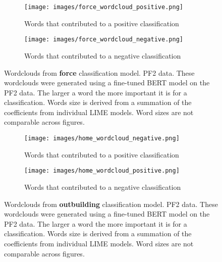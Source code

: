 \begin{figure}
     \centering
     \begin{subfigure}[b]{0.9\textwidth}
         \centering
         \texttt{[image: images/force\_wordcloud\_positive.png]}
         \caption{Words that contributed to a positive classification}
         \label{fig: wordcloud_force_lancs}
     \end{subfigure}
     \vfill
     \begin{subfigure}[b]{0.9\textwidth}
         \centering
         \texttt{[image: images/force\_wordcloud\_negative.png]}
         \caption{Words that contributed to a negative classification}
         \label{fig: wordcloud_force_rev_lancs}
     \end{subfigure}
        \caption[Wordclouds from  \textbf{force} classification model. PF2 data.]{{Wordclouds from  \textbf{force} classification model. PF2 data.} These wordclouds were generated using a fine-tuned BERT model on the PF2 data. The larger a word the more important it is for a classification. Words size is derived from a summation of the coefficients from individual LIME models. Word sizes are not comparable across figures.}
        \label{fig:wordcloud_force_both_lancs}
        
\end{figure}




\begin{figure}
     \centering
     \begin{subfigure}[b]{0.9\textwidth}
         \centering
         \texttt{[image: images/home\_wordcloud\_negative.png]}
         \caption{Words that contributed to a positive classification}
         \label{fig: wordcloud_home_lancs}
     \end{subfigure}
     \vfill
     \begin{subfigure}[b]{0.9\textwidth}
         \centering
         \texttt{[image: images/home\_wordcloud\_positive.png]}
         \caption{Words that contributed to a negative classification}
         \label{fig: wordcloud_home_rev_lancs}
     \end{subfigure}
        \caption[Wordclouds from  \textbf{outbuilding} classification model. PF2 data.]{{Wordclouds from  \textbf{outbuilding} classification model. PF2 data.} These wordclouds were generated using a fine-tuned BERT model on the PF2 data. The larger a word the more important it is for a classification. Words size is derived from a summation of the coefficients from individual LIME models. Word sizes are not comparable across figures.}
        \label{fig:wordcloud_home_both_lancs}
        
\end{figure}




